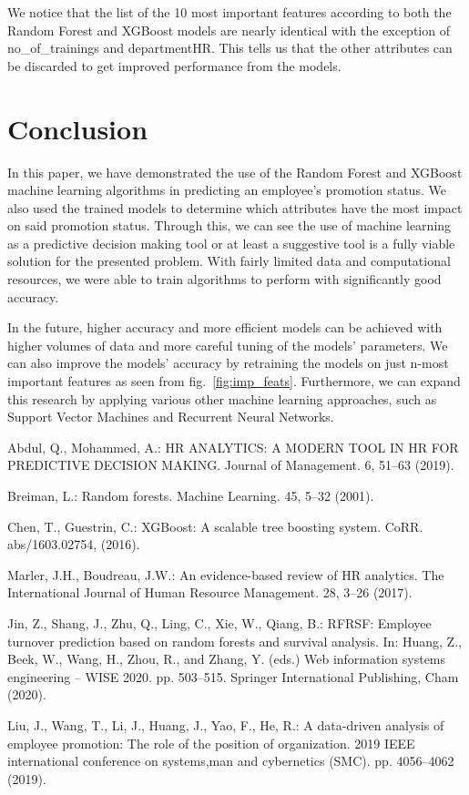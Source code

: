 \documentclass[runningheads]{llncs}
\begin{document}
\newpage

We notice that the list of the 10 most important features according to
both the Random Forest and XGBoost models are nearly identical with the
exception of no\_of\_trainings and departmentHR. This tells us that the
other attributes can be discarded to get improved performance from the
models.

\hypertarget{conclusion}{%
\section{Conclusion}\label{conclusion}}

In this paper, we have demonstrated the use of the Random Forest and
XGBoost machine learning algorithms in predicting an employee's
promotion status. We also used the trained models to determine which
attributes have the most impact on said promotion status. Through this,
we can see the use of machine learning as a predictive decision making
tool or at least a suggestive tool is a fully viable solution for the
presented problem. With fairly limited data and computational resources,
we were able to train algorithms to perform with significantly good
accuracy.

In the future, higher accuracy and more efficient models can be achieved
with higher volumes of data and more careful tuning of the models'
parameters. We can also improve the models' accuracy by retraining the
models on just n-most important features as seen from
fig.~\ref{fig:imp_feats}. Furthermore, we can expand this research by
applying various other machine learning approaches, such as Support
Vector Machines and Recurrent Neural Networks.


\begin{thebibliography}{8}
%
{Abdul, Q., Mohammed, A.: HR ANALYTICS: A MODERN TOOL IN
HR FOR PREDICTIVE DECISION MAKING. Journal of Management. 6, 51--63
(2019).}

%
{Breiman, L.: Random forests. Machine Learning. 45, 5--32
(2001).}

%
{Chen, T., Guestrin, C.: XGBoost: {A} scalable tree
boosting system. CoRR. abs/1603.02754, (2016).}

%
{Marler, J.H., Boudreau, J.W.: An evidence-based review
of HR analytics. The International Journal of Human Resource Management.
28, 3--26 (2017).}

%
{Jin, Z., Shang, J., Zhu, Q., Ling, C., Xie, W., Qiang,
B.: RFRSF: Employee turnover prediction based on random forests and
survival analysis. In: Huang, Z., Beek, W., Wang, H., Zhou, R., and
Zhang, Y. (eds.) Web information systems engineering -- WISE 2020. pp.
503--515. Springer International Publishing, Cham (2020).}

%
{Liu, J., Wang, T., Li, J., Huang, J., Yao, F., He, R.: A
data-driven analysis of employee promotion: The role of the position of
organization. 2019 IEEE international conference on systems,man and
cybernetics (SMC). pp. 4056--4062 (2019).}

\end{thebibliography}
\end{document}
